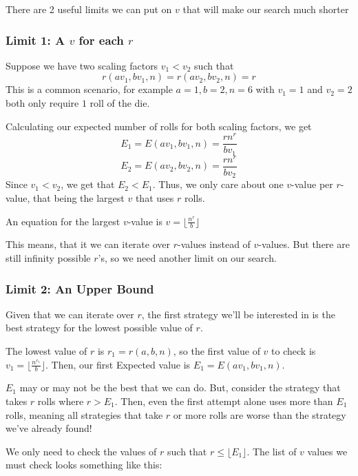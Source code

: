 \documentclass{article}
\begin{document}
There are 2 useful limits we can put on $v$ that will make our search much shorter

\subsubsection{Limit 1: A $v$ for each $r$}
Suppose we have two scaling factors $v_1<v_2$ such that 
$$r(av_1,bv_1,n)=r(av_2,bv_2,n)=r$$
This is a common scenario, for example $a=1,b=2,n=6$ with $v_1=1$ and $v_2=2$ both only require $1$ roll of the die.\newline

Calculating our expected number of rolls for both scaling factors, we get
$$E_1=E(av_1,bv_1,n)=\frac{rn^{r}}{bv_1}$$
$$E_2=E(av_2,bv_2,n)=\frac{rn^{r}}{bv_2}$$
Since $v_1<v_2$, we get that $E_2<E_1$. Thus, we only care about one $v$-value per $r$-value, that being the largest $v$ that uses $r$ rolls.\newline

An equation for the largest $v$-value is $v=\lfloor\frac{n^r}{b}\rfloor$\newline

This means, that it we can iterate over $r$-values instead of $v$-values. But there are still infinity possible $r$'s, so we need another limit on our search.

\subsubsection{Limit 2: An Upper Bound}
Given that we can iterate over $r$, the first strategy we'll be interested in is the best strategy for the lowest possible value of $r$.\newline

The lowest value of $r$ is $r_1=r(a,b,n)$, so the first value of $v$ to check is $v_1=\lfloor\frac{n^{r_1}}{b}\rfloor$. Then, our first Expected value is $E_1=E(av_1,bv_1,n)$.\newline

$E_1$ may or may not be the best that we can do. But, consider the strategy that takes $r$ rolls where $r>E_1$. Then, even the first attempt alone uses more than $E_1$ rolls, meaning all strategies that take $r$ or more rolls are worse than the strategy we've already found!\newline

We only need to check the values of $r$ such that $r\leq \lfloor E_1\rfloor$. The list of $v$ values we must check looks something like this:
\end{document}
